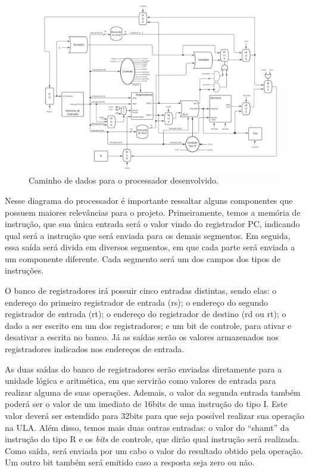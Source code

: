 \documentclass[
	12pt,				%
	oneside,
	a4paper,			%
	english,			%
	french,				%
	spanish,			%
	brazil,				%
	]{abntex2}
\begin{document}
\begin{figure}[ht]
\centering 
\caption{Caminho de dados para o processador desenvolvido.} \label{fig:Datapath_Alterado}
\graphicspath{ {./imgs/} } 
\includegraphics[scale=0.11]{Datapath_Alterado.png}
\end{figure}

Nesse diagrama do processador é importante ressaltar alguns componentes que possuem maiores relevâncias para o projeto. Primeiramente, temos a memória de instrução, que sua única entrada será o valor vindo do registrador PC, indicando qual será a instrução que será enviada para os demais segmentos. Em seguida, essa saída será divida em diversos segmentos, em que cada parte será enviada a um componente diferente. Cada segmento será um dos campos dos tipos de instruções. 

O banco de registradores irá possuir cinco entradas distintas, sendo elas: o endereço do primeiro registrador de entrada (rs); o endereço do segundo registrador de entrada (rt); o endereço do registrador de destino (rd ou rt); o dado a ser escrito em um dos registradores; e um bit de controle, para ativar e desativar a escrita no banco. Já as saídas serão os valores armazenados nos registradores indicados nos endereços de entrada.

As duas saídas do banco de registradores serão enviadas diretamente para a unidade lógica e aritmética, em que servirão como valores de entrada para realizar alguma de suas operações. Ademais, o valor da segunda entrada também poderá ser o valor de um imediato de 16bits de uma instrução do tipo I. Este valor deverá ser estendido para 32bits para que seja possível realizar sua operação na ULA. Além disso, temos mais duas outras entradas: o valor do ``shamt'' da instrução do tipo R e os \emph{bits} de controle, que dirão qual instrução será realizada. Como saída, será enviada por um cabo o valor do resultado obtido pela operação. Um outro bit também será emitido caso a resposta seja zero ou não.
\end{document}
